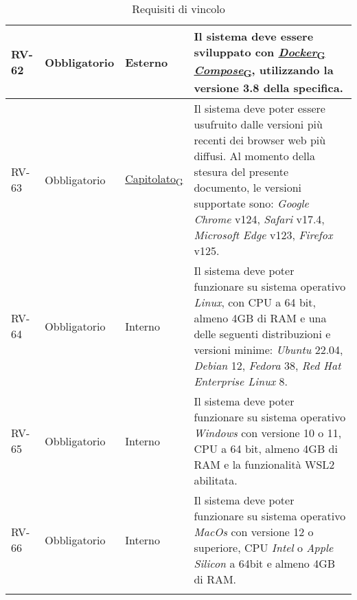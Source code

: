 \begin{longtable}{|>{\centering\arraybackslash}m{}|>{\centering\arraybackslash}m{}|>{\centering\arraybackslash}m{}|>{\centering\arraybackslash}m{}|}
	\\\hline
	RV-62           & Obbligatorio        & Esterno                                                                                                           & Il sistema deve essere sviluppato con \href{https://7last.github.io/docs/rtb/documentazione-interna/glossario\#docker-compose}{\href{https://7last.github.io/docs/rtb/documentazione-interna/glossario\#docker}{\textit{Docker}\textsubscript{G}}\textit{ Compose}\textsubscript{G}}, utilizzando la versione 3.8 della specifica.
	\\\hline
	RV-63           & Obbligatorio        & \href{https://7last.github.io/docs/rtb/documentazione-interna/glossario\#capitolato}{Capitolato\textsubscript{G}} & Il sistema deve poter essere usufruito dalle versioni più recenti dei browser web più diffusi. Al momento della stesura del presente documento, le versioni supportate sono: \textit{Google Chrome} v124, \textit{Safari} v17.4, \textit{Microsoft Edge} v123, \textit{Firefox} v125.
	\\\hline
	RV-64           & Obbligatorio        & Interno                                                                                                           & Il sistema deve poter funzionare su sistema operativo \textit{Linux}, con CPU a 64 bit, almeno 4GB di RAM e una delle seguenti distribuzioni e versioni minime: \textit{Ubuntu} 22.04, \textit{Debian} 12, \textit{Fedora} 38, \textit{Red Hat Enterprise Linux} 8.
	\\\hline
	RV-65           & Obbligatorio        & Interno                                                                                                           & Il sistema deve poter funzionare su sistema operativo \textit{Windows} con versione 10 o 11, CPU a 64 bit, almeno 4GB di RAM e la funzionalità WSL2 abilitata.
	\\\hline
	RV-66           & Obbligatorio        & Interno                                                                                                           & Il sistema deve poter funzionare su sistema operativo \textit{MacOs} con versione 12 o superiore, CPU \textit{Intel} o \textit{Apple Silicon} a 64bit e almeno 4GB di RAM.
	\\\hline
	\caption{Requisiti di vincolo}
\end{longtable}

